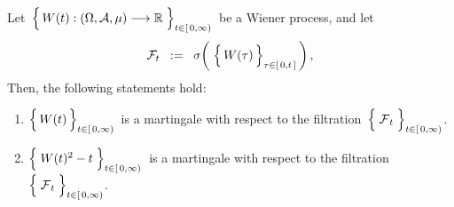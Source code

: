 \vskip 0.5cm
\begin{proposition}
\label{WienerProcessMartingales}
\mbox{}
\vskip 0.2cm
\noindent
Let
\,$\left\{\,\overset{{\color{white}.}}{W}(t) : (\Omega,\mathcal{A},\mu) \longrightarrow \Re \;\right\}_{t \in[\,0,\infty)}$\,
be a Wiener process, and let
\begin{equation*}
\mathcal{F}_{t}
\;\; := \;\;
	\sigma\!\left(\;\left\{\,
		\overset{{\color{white}.}}{W}(\tau)
		\,\right\}_{\tau \in [\,0,t\,]}\,\right),
\end{equation*}	
Then, the following statements hold:
\begin{enumerate}
\item
	$\left\{\,\overset{{\color{white}.}}{W}(t)\,\right\}_{t \in[\,0,\infty)}$\,
	is a martingale with respect to the filtration
	\,$\left\{\;\overset{{\color{white}.}}{\mathcal{F}}_{t}\;\right\}_{t\in[\,0,\infty)}$.
\item
	$\left\{\; \overset{{\color{white}.}}{W}(t)^{2} - t \;\right\}_{t \in[\,0,\infty)}$\,
	is a martingale with respect to the filtration
	\,$\left\{\;\overset{{\color{white}.}}{\mathcal{F}}_{t}\;\right\}_{t\in[\,0,\infty)}$.
\end{enumerate}
\end{proposition}
\proof
